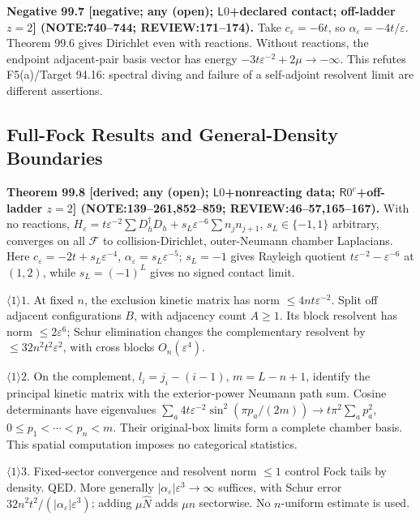 \textbf{Negative 99.7 [negative; any (open); \(\mathsf L0\)+declared contact; off-ladder \(z=2\)]
(NOTE:740--744; REVIEW:171--174).}
Take \(c_\varepsilon=-6t\), so \(\alpha_\varepsilon=-4t/\varepsilon\). Theorem 99.6 gives Dirichlet even with reactions.
Without reactions, the endpoint adjacent-pair basis vector has energy \(-3t\varepsilon^{-2}+2\mu\to-\infty\).
This refutes F5(a)/Target 94.16: spectral diving and failure of a self-adjoint resolvent limit are different assertions.

\subsection{Full-Fock Results and General-Density Boundaries}

\textbf{Theorem 99.8 [derived; any (open); \(\mathsf L0\)+nonreacting data; \(\mathsf R0^c\)+off-ladder \(z=2\)]
(NOTE:139--261,852--859; REVIEW:46--57,165--167).}
With no reactions, \(H_\varepsilon=t\varepsilon^{-2}\sum D_h^\dagger D_h+s_L\varepsilon^{-6}\sum n_jn_{j+1}\),
\(s_L\in\{-1,1\}\) arbitrary, converges on all \(\mathcal F\) to collision-Dirichlet, outer-Neumann chamber Laplacians.
Here \(c_\varepsilon=-2t+s_L\varepsilon^{-4}\), \(\alpha_\varepsilon=s_L\varepsilon^{-5}\); \(s_L=-1\) gives Rayleigh quotient
\(t\varepsilon^{-2}-\varepsilon^{-6}\) at \((1,2)\), while \(s_L=(-1)^L\) gives no signed contact limit.
\par\(\langle1\rangle1\). At fixed \(n\), the exclusion kinetic matrix has norm \(\le4nt\varepsilon^{-2}\).
Split off adjacent configurations \(B\), with adjacency count \(A\ge1\). Its block resolvent has norm \(\le2\varepsilon^6\);
Schur elimination changes the complementary resolvent by \(\le32n^2t^2\varepsilon^2\), with cross blocks \(O_n(\varepsilon^4)\).
\par\(\langle1\rangle2\). On the complement, \(l_i=j_i-(i-1)\), \(m=L-n+1\), identify the principal kinetic matrix
with the exterior-power Neumann path sum. Cosine determinants have eigenvalues
\(\sum_a4t\varepsilon^{-2}\sin^2(\pi p_a/(2m))\to t\pi^2\sum_ap_a^2\), \(0\le p_1<\cdots<p_n<m\).
Their original-box limits form a complete chamber basis. This spatial computation imposes no categorical statistics.
\par\(\langle1\rangle3\). Fixed-sector convergence and resolvent norm \(\le1\) control Fock tails by density. QED.
More generally \(|\alpha_\varepsilon|\varepsilon^3\to\infty\) suffices, with Schur error
\(32n^2t^2/(|\alpha_\varepsilon|\varepsilon^3)\); adding \(\mu\hat N\) adds \(\mu n\) sectorwise. No \(n\)-uniform estimate is used.

